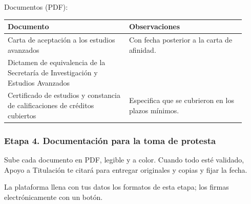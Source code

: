 Documentos (PDF):
{\small\begin{longtable}{>{\raggedright\arraybackslash}p{0.47\linewidth}>{\raggedright\arraybackslash}p{0.45\linewidth}}
\toprule
\textbf{Documento} & \textbf{Observaciones}\\
\midrule
\endhead
Carta de aceptación a los estudios avanzados & Con fecha posterior a la carta de afinidad.\\
Dictamen de equivalencia de la Secretaría de Investigación y Estudios Avanzados & \\
Certificado de estudios y constancia de calificaciones de créditos cubiertos & Especifica que se cubrieron en los plazos mínimos.\\
\bottomrule
\end{longtable}}
\subsubsection*{Etapa 4. Documentación para la toma de protesta}
Sube cada documento en PDF, legible y a color. Cuando todo esté validado, Apoyo a Titulación te citará para entregar originales y copias y fijar la fecha.

La plataforma llena con tus datos los formatos de esta etapa; los firmas electrónicamente con un botón.

